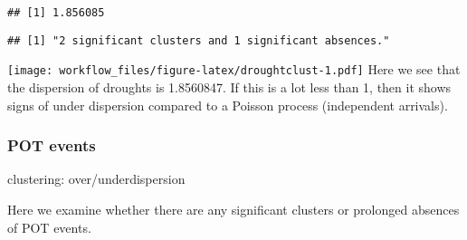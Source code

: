 \documentclass[
]{article}
\newenvironment{Shaded}{\begin{snugshade}}{\end{snugshade}}
\newcommand{\AttributeTok}[1]{\textcolor[rgb]{0.77,0.63,0.00}{#1}}
\newcommand{\DecValTok}[1]{\textcolor[rgb]{0.00,0.00,0.81}{#1}}
\newcommand{\FunctionTok}[1]{\textcolor[rgb]{0.00,0.00,0.00}{#1}}
\newcommand{\NormalTok}[1]{#1}
\newcommand{\OtherTok}[1]{\textcolor[rgb]{0.56,0.35,0.01}{#1}}
\newcommand{\SpecialCharTok}[1]{\textcolor[rgb]{0.00,0.00,0.00}{#1}}
\newcommand{\StringTok}[1]{\textcolor[rgb]{0.31,0.60,0.02}{#1}}
\begin{document}
\begin{verbatim}
## [1] 1.856085
\end{verbatim}

\begin{Shaded}
\end{Shaded}

\begin{verbatim}
## [1] "2 significant clusters and 1 significant absences."
\end{verbatim}

\texttt{[image: workflow\_files/figure-latex/droughtclust-1.pdf]} Here we
see that the dispersion of droughts is 1.8560847. If this is a lot less
than 1, then it shows signs of under dispersion compared to a Poisson
process (independent arrivals).

\hypertarget{pot-events}{%
\subsubsection{POT events}\label{pot-events}}

clustering: over/underdispersion

Here we examine whether there are any significant clusters or prolonged
absences of POT events.

\begin{Shaded}
\end{Shaded}
\end{document}
